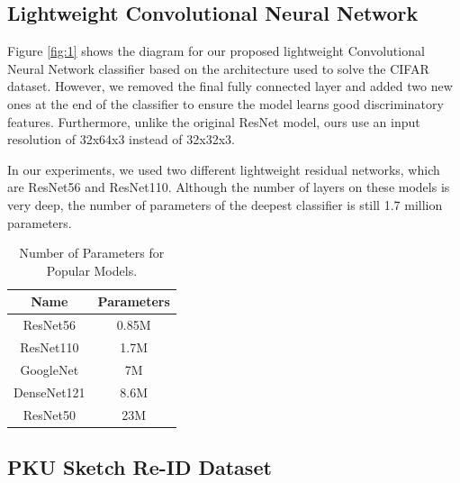 \documentclass[conference]{IEEEtran}
\begin{document}
	\vspace{1ex}
	
	\subsection{Lightweight Convolutional Neural Network}
	\vspace{1ex}
	Figure \ref{fig:1} shows the diagram for our proposed lightweight Convolutional Neural Network classifier based on the architecture used to solve the CIFAR dataset. However, we removed the final fully connected layer and added two new ones at the end of the classifier to ensure the model learns good discriminatory features. Furthermore, unlike the original ResNet model, ours use an input resolution of 32x64x3 instead of 32x32x3. 
	
	In our experiments, we used two different lightweight residual networks, which are ResNet56 and ResNet110. Although the number of layers on these models is very deep, the number of parameters of the deepest classifier is still 1.7 million parameters.
	
	\begin{table}[h!]
		\begin{center}
			\begin{tabular}{|c|c|}
				\hline
				\textbf{Name} & \textbf{Parameters} \\ \hline
				ResNet56 & 0.85M \\ \hline
				ResNet110 & 1.7M \\ \hline
				GoogleNet & 7M \\ \hline
				DenseNet121 & 8.6M \\ \hline
				ResNet50 & 23M \\ \hline
			\end{tabular}
		\end{center}
		\vspace{1ex}
		\caption{Number of Parameters for Popular Models.}
		\label{tabel:1}
	\end{table}

	\subsection{PKU Sketch Re-ID Dataset}
	\vspace{1ex}
	
\end{document}
